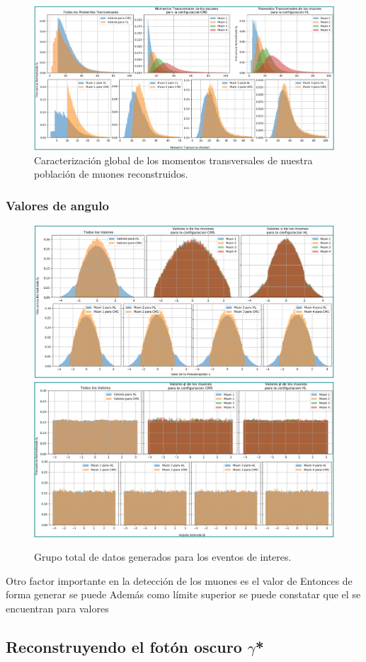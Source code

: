 \begin{figure}[!ht]
\centering
\includegraphics[width=.8\textwidth]{Simulacion/imagenes/Datos_PT_ALL.png}
\caption{Caracterización global de los momentos transversales de nuestra población de muones reconstruidos.}
\label{procesos_darksusy_PTyISO}
\end{figure}



\subsubsection{Valores de angulo}
\begin{figure}[!ht]
\centering
\includegraphics[width=.8\textwidth]{Simulacion/imagenes/Datos_Eta_ALL.png}
\includegraphics[width=.8\textwidth]{Simulacion/imagenes/Datos_Phi_ALL.png}
\caption{Grupo total de datos generados para los eventos de interes.}
\label{procesos_darksusy_ETAyPHI}
\end{figure}





Otro factor importante en la detección de los muones es el valor de Entonces de forma generar se puede Además como límite superior se puede constatar que el  se encuentran para valores 


\subsection{Reconstruyendo el fotón oscuro $\gamma$*}











